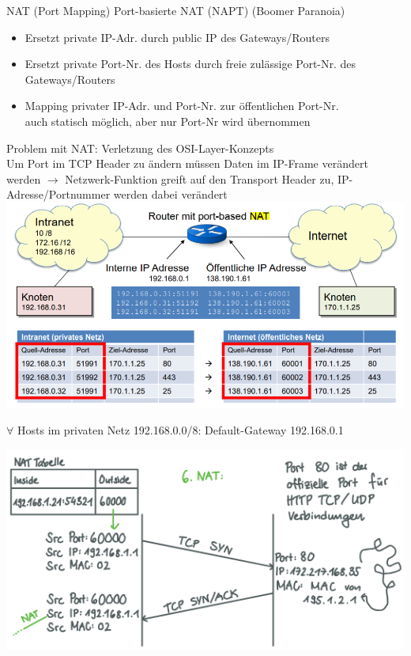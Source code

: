 \begin{definition}{NAT (Port Mapping)} Port-basierte NAT (NAPT) {\tiny (Boomer Paranoia)}    
    \begin{itemize}
        \item Ersetzt private IP-Adr. durch public IP des Gateways/Routers
        \item Ersetzt private Port-Nr. des Hosts durch freie zulässige Port-Nr. des Gateways/Routers
        \item Mapping privater IP-Adr. und Port-Nr. zur öffentlichen Port-Nr.
                \\auch statisch möglich, aber nur Port-Nr wird übernommen
    \end{itemize}
    Problem mit NAT: Verletzung des OSI-Layer-Konzepts\\
    Um Port im TCP Header zu ändern müssen Daten im IP-Frame verändert werden 
    $\rightarrow$ Netzwerk-Funktion greift auf den Transport Header zu,
    IP-Adresse/Portnummer werden dabei verändert\\
        \includegraphics[width=1\linewidth]{images/NAT.png}
\end{definition}
\begin{remark}
    $\forall$ Hosts im privaten Netz 192.168.0.0/8: Default-Gateway 192.168.0.1
\end{remark}

\includegraphics[width=1\linewidth]{images/atoz3.png}



